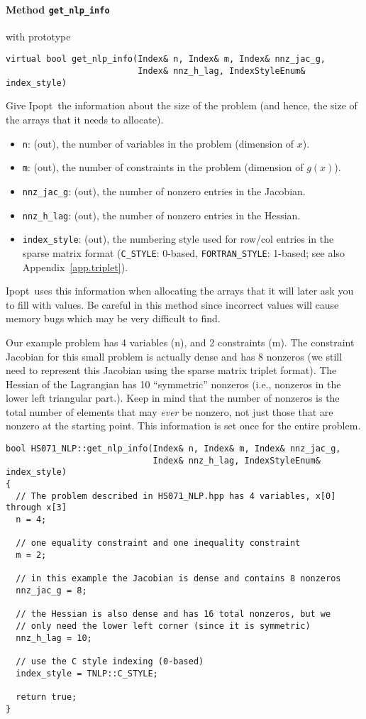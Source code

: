 \documentclass[10pt]{article}
\newcommand{\Ipopt}{{\sc Ipopt}}
\begin{document}
\paragraph{Method {\texttt{get\_nlp\_info}}} with prototype
\begin{verbatim}
virtual bool get_nlp_info(Index& n, Index& m, Index& nnz_jac_g,
                          Index& nnz_h_lag, IndexStyleEnum& index_style)
\end{verbatim}
Give \Ipopt\ the information about the size of the problem (and hence,
the size of the arrays that it needs to allocate). 
\begin{itemize}
\item {\tt n}: (out), the number of variables in the problem (dimension of $x$).
\item {\tt m}: (out), the number of constraints in the problem (dimension of $g(x)$).
\item {\tt nnz\_jac\_g}: (out), the number of nonzero entries in the Jacobian.
\item {\tt nnz\_h\_lag}: (out), the number of nonzero entries in the Hessian.
\item {\tt index\_style}: (out), the numbering style used for row/col entries in the sparse matrix
format ({\tt C\_STYLE}: 0-based, {\tt FORTRAN\_STYLE}: 1-based; see
also Appendix~\ref{app.triplet}).
\end{itemize}
\Ipopt\ uses this information when allocating the arrays that
it will later ask you to fill with values. Be careful in this method
since incorrect values will cause memory bugs which may be very
difficult to find.

Our example problem has 4 variables (n), and 2 constraints (m). The
constraint Jacobian for this small problem is actually dense and has 8
nonzeros (we still need to represent this Jacobian using the sparse
matrix triplet format). The Hessian of the Lagrangian has 10
``symmetric'' nonzeros (i.e., nonzeros in the lower left triangular
part.).  Keep in mind that the number of nonzeros is the total number
of elements that may \emph{ever} be nonzero, not just those that are
nonzero at the starting point. This information is set once for the
entire problem.

\begin{footnotesize}
\begin{verbatim}
bool HS071_NLP::get_nlp_info(Index& n, Index& m, Index& nnz_jac_g, 
                             Index& nnz_h_lag, IndexStyleEnum& index_style)
{
  // The problem described in HS071_NLP.hpp has 4 variables, x[0] through x[3]
  n = 4;

  // one equality constraint and one inequality constraint
  m = 2;

  // in this example the Jacobian is dense and contains 8 nonzeros
  nnz_jac_g = 8;

  // the Hessian is also dense and has 16 total nonzeros, but we
  // only need the lower left corner (since it is symmetric)
  nnz_h_lag = 10;

  // use the C style indexing (0-based)
  index_style = TNLP::C_STYLE;

  return true;
}
\end{verbatim}
\end{footnotesize}
\end{document}

